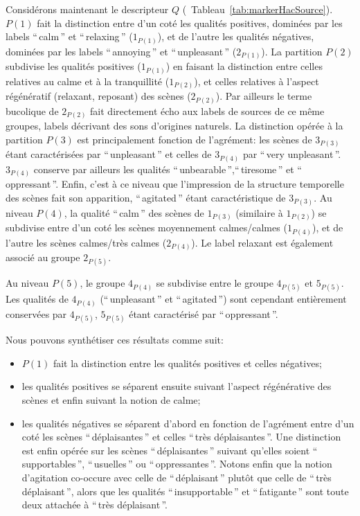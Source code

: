 Considérons maintenant le descripteur $Q$ (\cf~Tableau~\ref{tab:markerHacSource}). $P(1)$ fait la distinction entre d'un coté les qualités positives, dominées par les labels ``\,calm\,'' et ``\,relaxing\,'' ($1_{P(1)}$), et de l'autre les qualités négatives, dominées par les labels ``\,annoying\,'' et ``\,unpleasant\,'' ($2_{P(1)}$). La partition $P(2)$ subdivise les qualités positives ($1_{P(1)}$) en faisant la distinction entre celles relatives au calme et à la tranquillité ($1_{P(2)}$), et celles relatives à l'aspect régénératif (relaxant, reposant) des scènes ($2_{P(2)}$). Par ailleurs le terme bucolique de $2_{P(2)}$ fait directement écho aux labels de sources de ce même groupes, labels décrivant des sons d'origines naturels.  La distinction opérée à la partition $P(3)$ est principalement fonction de l'agrément: les scènes de $3_{P(3)}$ étant caractérisées par ``\,unpleasant\,'' et celles de  $3_{P(4)}$ par ``\,very unpleasant\,''.  $3_{P(4)}$ conserve par ailleurs les qualités  ``\,unbearable\,'',``\,tiresome\,'' et ``\,oppressant\,''. Enfin, c'est à ce niveau que l'impression de la structure temporelle des scènes fait son apparition,  ``\,agitated\,'' étant caractéristique de $3_{P(3)}$. Au niveau $P(4)$, la qualité ``\,calm\,'' des scènes de $1_{P(3)}$ (similaire à $1_{P(2)}$) se subdivise entre d'un coté les scènes moyennement calmes/calmes ($1_{P(4)}$), et de l'autre les scènes calmes/très calmes ($2_{P(4)}$). Le label relaxant est également associé au groupe $2_{P(5)}$.

Au niveau $P(5)$, le groupe $4_{P(4)}$ se subdivise entre le groupe $4_{P(5)}$ et $5_{P(5)}$. Les qualités de $4_{P(4)}$  (``\,unpleasant\,'' et ``\,agitated\,'') sont cependant entièrement conservées par $4_{P(5)}$,  $5_{P(5)}$ étant caractérisé par ``\,oppressant\,''.

Nous pouvons synthétiser ces résultats comme suit:

\begin{itemize}
\item $P(1)$ fait la distinction entre les qualités positives et celles négatives;
\item les qualités positives se séparent ensuite suivant l'aspect régénérative des scènes et enfin suivant la notion de calme;
\item les qualités négatives se séparent d'abord  en fonction de l'agrément entre d'un coté les scènes ``\,déplaisantes\,'' et celles ``\,très déplaisantes\,''. Une distinction est enfin opérée sur les scènes ``\,déplaisantes\,'' suivant qu'elles soient ``\,supportables\,'', ``\,usuelles\,'' ou ``\,oppressantes\,''. Notons enfin que la notion d'agitation co-occure avec celle de ``\,déplaisant\,'' plutôt que celle de ``\,très déplaisant\,'', alors que les qualités ``\,insupportable\,'' et ``\,fatigante\,'' sont toute deux attachée à ``\,très déplaisant\,''.
\end{itemize}

